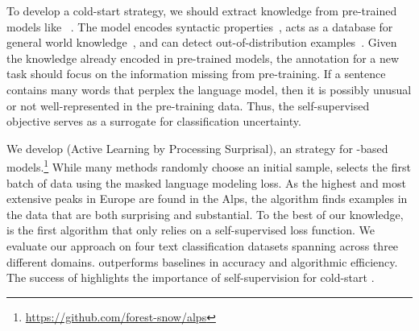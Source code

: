To develop a cold-start  strategy, we should extract knowledge from pre-trained models like
\bert{}~\citep{devlin-2019}.
The model encodes syntactic properties~\citep{tenney-2019},
acts as a database for
general world
knowledge~\citep{petroni-2019,davison-2019}, and can detect out-of-distribution
examples~\citep{hendrycks-2020}.
Given the knowledge already encoded in pre-trained models, the annotation for
a new task should focus on the information missing from pre-training.
If a sentence contains many words that perplex the language model, then
it is possibly unusual or not well-represented in the
pre-training data.
Thus, the self-supervised objective serves as a surrogate for classification uncertainty.

We develop \alps{} (Active Learning by Processing Surprisal), an \al{} strategy
for \bert-based models.\footnote{\url{https://github.com/forest-snow/alps}}
While many \al{}
methods randomly choose an initial sample, \alps{}
selects the first batch of data using the masked language modeling loss.
As the highest and most extensive peaks
in Europe are found in the Alps,
the \alps{} algorithm finds examples in the data that are both surprising and substantial.
To the best of our knowledge, \alps{} is the first \al{} algorithm that only
relies on a self-supervised loss function. We evaluate our approach on four text
classification datasets spanning across three different domains.
\alps{}
outperforms  \al{} baselines in accuracy and algorithmic efficiency.
The success of \alps{} highlights the importance of self-supervision
for cold-start \al.



